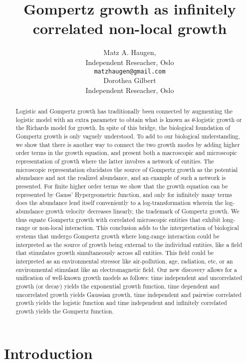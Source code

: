 \documentclass{article}
\title{Gompertz growth as infinitely correlated non-local growth}
\author{Matz A. Haugen, \\
Independent Reseacher, Oslo\\
\texttt{matzhaugen@gmail.com} \\
  \And
  Dorothea Gilbert \\
  Independent Reseacher, Oslo\\
}
\begin{document}
\maketitle

\begin{abstract}
Logistic and Gompertz growth has traditionally been connected by augmenting the logistic model with an extra parameter to obtain what is known as $\theta$-logistic growth or the Richards model for growth. In spite of this bridge, the biological foundation of Gompertz growth is only vaguely understood. To add to our biological understanding, we show that there is another way to connect the two growth modes by adding higher order terms in the growth equation, and present both a macroscopic and microscopic representation of growth where the latter involves a network of entities. The microscopic representation elucidates the source of Gompertz growth as the potential abundance and not the realized abundance, and an example of such a network is presented. For finite higher order terms we show that the growth equation can be represented by Gauss' Hypergeometric function, and only for infinitely many terms does the abundance lend itself conveniently to a log-transformation wherein the log-abundance growth velocity decreases linearly, the trademark of Gompertz growth. We thus equate Gompertz growth with correlated microscopic entities that exhibit long-range or non-local interaction. This conclusion adds to the interpretation of biological systems that undergo Gompertz growth where long-range interaction could be interpreted as the source of growth being external to the individual entities, like a field that stimulates growth simultaneously across all entities. This field could be interpreted as an environmental stressor like air-pollution, age, radiation, etc, or an environmental stimulant like an electromagnetic field. Our new discovery allows for a unification of well-known growth models as follows: time independent and uncorrelated growth (or decay) yields the exponential growth function, time dependent and uncorrelated growth yields Gaussian growth, time independent and pairwise correlated growth yields the logistic function and time independent and infinitely correlated growth yields the Gompertz function. 

\end{abstract}


\section{Introduction}
\end{document}
